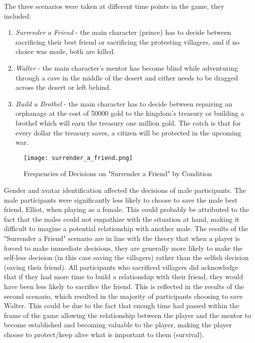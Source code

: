 \documentclass[12pt]{report}
\begin{document}
The three scenarios were taken at different time points in the game, they included:
\begin{enumerate}
\item \textit{Surrender a Friend} - the main character (prince) has to decide between sacrificing their best friend or sacrificing the protesting villagers, and if no choice was made, both are killed.

\item \textit{Walter} - the main character's mentor has become blind while adventuring through a cave in the middle of the desert and either needs to be dragged across the desert or left behind.

\item \textit{Build a Brothel} - the main character has to decide between repairing an orphanage at the cost of 50000 gold to the kingdom's treasury or building a brothel which will earn the treasury one million gold. The catch is that for every dollar the treasury saves, a citizen will be protected in the upcoming war.
\end{enumerate}

\begin{figure}[h]
\begin{center}
\leavevmode
\texttt{[image: surrender\_a\_friend.png]}
\end{center}
\caption{Frequencies of Decisions on "Surrender a Friend" by Condition \cite{Ethical_Choices_in_Fable_3}}
\label{fig:surrender_a_friend}
\end{figure}

Gender and avatar identification affected the decisions of male participants. The male participants were significantly less likely to choose to save the male best friend, Elliot, when playing as a female. This could probably be attributed to the fact that the males could not empathize with the situation at hand, making it difficult to imagine a potential relationship with another male. The results of the "Surrender a Friend" scenario are in line with the theory that when a player is forced to make immediate decisions, they are generally more likely to make the self-less decision (in this case saving the villagers) rather than the selfish decision (saving their friend). All participants who sacrificed villagers did acknowledge that if they had more time to build a relationship with their friend, they would have been less likely to sacrifice the friend.\cite{Ethical_Choices_in_Fable_3} This is reflected in the results of the second scenario, which resulted in the majority of participants choosing to save Walter. This could be due to the fact that enough time had passed within the frame of the game allowing the relationship between the player and the mentor to become established and becoming valuable to the player, making the player choose to protect/keep alive what is important to them (survival).
\end{document}
